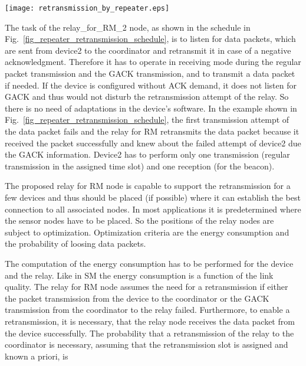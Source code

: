 \documentclass[times,10pt,twocolumn]{article}
\begin{document}
\begin{figure*}[!t]
\centering
\texttt{[image: retransmission\_by\_repeater.eps]}
\caption{Example of the proposed retransmission mode (RM) with one relay node and one device}
    \label{fig_repeater_retransmission_schedule}
\end{figure*}


The task of the relay\_for\_RM\_2 node, as shown in the schedule in Fig.~\ref{fig_repeater_retransmission_schedule}, is to listen for data packets, which are sent from device2 to the coordinator and retransmit it in case of a negative acknowledgment. Therefore it has to operate in receiving mode during the regular packet transmission and the GACK transmission, and to transmit a data packet if needed. If the device is configured without ACK demand, it does not listen for GACK and thus would not disturb the retransmission attempt of the relay. So there is no need of adaptations in the device's software. In the example shown in Fig.~\ref{fig_repeater_retransmission_schedule}, the first transmission attempt of the data packet fails and the relay for RM retransmits the data packet because it received the packet successfully and knew about the failed attempt of device2 due the GACK information. Device2 has to perform only one transmission (regular transmission in the assigned time slot) and one reception (for the beacon).

The proposed relay for RM node is capable to support the retransmission for a few devices and thus should be placed (if possible) where it can establish the best connection to all associated nodes. In most applications it is predetermined where the sensor nodes have to be placed. So the positions of the relay nodes are subject to optimization. Optimization criteria are the energy consumption and the probability of loosing data packets.

The computation of the energy consumption has to be performed for the device and the relay. Like in SM the energy consumption is a function of the link quality.
The relay for RM node assumes the need for a retransmission if either the packet transmission from the device to the coordinator or the GACK transmission from the coordinator to the relay failed. Furthermore, to enable a retransmission, it is necessary, that the relay node receives the data packet from the device successfully. The probability that a retransmission of the relay to the coordinator is necessary, assuming that the retransmission slot is assigned and known a priori, is
\end{document}
